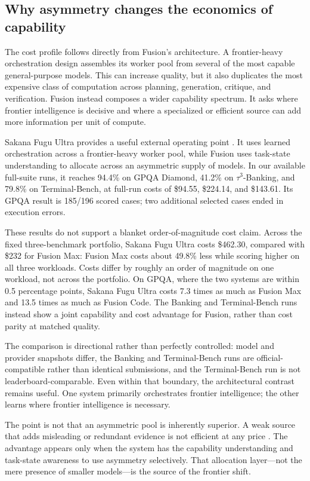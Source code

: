 \subsection{Why asymmetry changes the economics of capability}

The cost profile follows directly from Fusion's architecture. A frontier-heavy
orchestration design assembles its worker pool from several of the most capable
general-purpose models. This can increase quality, but it also duplicates the
most expensive class of computation across planning, generation, critique, and
verification. Fusion instead composes a wider capability spectrum. It asks
where frontier intelligence is decisive and where a specialized or efficient
source can add more information per unit of compute.

Sakana Fugu Ultra provides a useful external operating point
\citep{fugu2026}. It uses learned orchestration across a frontier-heavy worker
pool, while Fusion uses task-state understanding to allocate across an
asymmetric supply of models. In our available full-suite runs, it reaches
94.4\% on GPQA Diamond, 41.2\% on
$\tau^3$-Banking, and 79.8\% on Terminal-Bench, at full-run costs of \$94.55,
\$224.14, and \$143.61. Its GPQA result is 185/196 scored cases; two additional
selected cases ended in execution errors.

These results do not support a blanket order-of-magnitude cost claim. Across
the fixed three-benchmark portfolio, Sakana Fugu Ultra costs \$462.30, compared
with \$232 for Fusion Max: Fusion Max costs about 49.8\% less while scoring
higher on all three workloads. Costs differ by roughly an order of magnitude
on one workload, not across the portfolio. On GPQA, where the two systems are
within 0.5 percentage points, Sakana Fugu Ultra costs 7.3 times as much as
Fusion Max and 13.5 times as much as Fusion Code. The Banking and
Terminal-Bench runs instead show a joint capability and cost advantage for
Fusion, rather than cost parity at matched quality.

The comparison is directional rather than perfectly controlled: model and
provider snapshots differ, the Banking and Terminal-Bench runs are
official-compatible rather than identical submissions, and the Terminal-Bench
run is not leaderboard-comparable. Even within that boundary, the architectural
contrast remains useful. One system primarily orchestrates frontier
intelligence; the other learns where frontier intelligence is necessary.

The point is not that an asymmetric pool is inherently superior. A weak source
that adds misleading or redundant evidence is not efficient at any price
\citep{li2025rethinkingmoa}. The advantage appears only when the system has the
capability understanding and task-state awareness to use asymmetry
selectively. That allocation layer---not the mere presence of smaller
models---is the source of the frontier shift.

